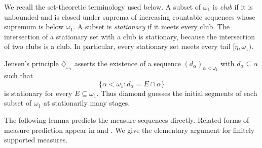 \documentclass[a4paper,11pt]{amsart}
\theoremstyle{plain}
\theoremstyle{definition}
\theoremstyle{remark}
\numberwithin{equation}{section}
\begin{document}
We recall the set-theoretic terminology used below.  A subset of $\omega_1$ is \emph{club} if it is unbounded and is closed under suprema of increasing countable sequences whose supremum is below $\omega_1$.  A subset is \emph{stationary} if it meets every club.  The intersection of a stationary set with a club is stationary, because the intersection of two clubs is a club.  In particular, every stationary set meets every tail $[\eta,\omega_1)$.

Jensen's principle $\diamondsuit_{\omega_1}$ asserts the existence of a sequence $(d_\alpha)_{\alpha<\omega_1}$ with $d_\alpha\subseteq\alpha$ such that
\[
 \{\alpha<\omega_1:d_\alpha=E\cap\alpha\}
\]
is stationary for every $E\subseteq\omega_1$.  Thus diamond guesses the initial segments of each subset of $\omega_1$ at stationarily many stages.

The following lemma predicts the measure sequences directly. Related
forms of measure prediction appear in \cite[Lemma~6.4]{Glodkowski}
and \cite[Lemma~26]{KoszmiderSilber}. We give the elementary argument
for finitely supported measures.
\end{document}
